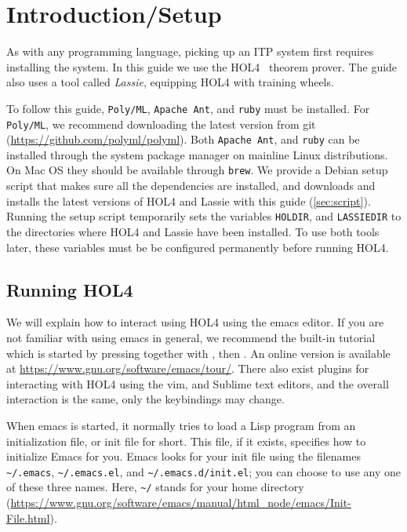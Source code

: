 \section{Introduction/Setup}
%
As with any programming language, picking up an ITP system first requires
installing the system.
In this guide we use the HOL4~\cite{HOL4web} theorem prover.
The guide also uses a tool called \emph{Lassie}, equipping HOL4 with training
wheels.

To follow this guide, \texttt{Poly/ML}, \texttt{Apache Ant}, and \texttt{ruby}
must be installed.
For \texttt{Poly/ML}, we recommend downloading the latest version from git
(\url{https://github.com/polyml/polyml}).
Both \texttt{Apache Ant}, and \texttt{ruby} can be installed through the system
package manager on mainline Linux distributions.
On Mac OS they should be available through \texttt{brew}.
We provide a Debian setup script that makes sure all the dependencies are
installed,
and downloads and installs the latest versions of HOL4 and Lassie with this
guide (\autoref{sec:script}).
Running the setup script temporarily sets the variables \texttt{HOLDIR}, and
\texttt{LASSIEDIR} to the directories where HOL4 and Lassie have been installed.
To use both tools later, these variables must be be configured permanently
before running HOL4.

\subsection{Running HOL4}

We will explain how to interact using HOL4 using the emacs editor.
If you are not familiar with using emacs in general, we recommend the
built-in tutorial which is started by pressing  together with
, then . An online version is available at
\url{https://www.gnu.org/software/emacs/tour/}.
There also exist plugins for interacting with HOL4 using the vim, and Sublime
text editors, and the overall interaction is the same, only the keybindings may
change.

When emacs is started, it normally tries to load a Lisp program from an
initialization file, or init file for short. This file, if it exists, specifies
how to initialize Emacs for you. Emacs looks for your init file using the
filenames \verb!~/.emacs!, \verb!~/.emacs.el!, and
\verb!~/.emacs.d/init.el!; you can choose to use any one of these three names.
Here, \verb!~/! stands for your home directory
(\url{https://www.gnu.org/software/emacs/manual/html_node/emacs/Init-File.html}).

